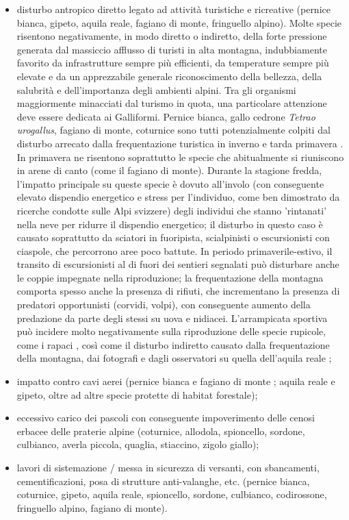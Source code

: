 \documentclass[10pt,twoside,openany,x11names,svgnames,italian,a5paper,dvipsnames,table]{memoir}
\begin{document}
\begin{itemize}
  \item disturbo antropico diretto legato ad attività turistiche e ricreative (pernice bianca, gipeto, aquila reale, fagiano di monte, fringuello alpino). Molte specie risentono negativamente, in modo diretto o indiretto, della forte pressione generata dal massiccio afflusso di turisti in alta montagna, indubbiamente favorito da infrastrutture sempre più efficienti, da temperature sempre più elevate e da un apprezzabile generale riconoscimento della bellezza, della salubrità e dell'importanza degli ambienti alpini. Tra gli organismi maggiormente minacciati dal turismo in quota, una particolare attenzione deve essere dedicata ai Galliformi. Pernice bianca, gallo cedrone \emph{Tetrao urogallus}, fagiano di monte, coturnice sono tutti potenzialmente colpiti dal disturbo arrecato dalla frequentazione turistica in inverno e tarda primavera \cite{Brenot96} \cite{Arlettaz07} \cite{Mollet07} \cite{Thiel07}. In primavera ne risentono soprattutto le specie che abitualmente si riuniscono in arene di canto (come il fagiano di monte). Durante la stagione fredda, l'impatto principale su queste specie è dovuto all'involo (con conseguente elevato dispendio energetico e stress per l'individuo, come ben dimostrato da ricerche condotte sulle Alpi svizzere) degli individui che stanno 'rintanati' nella neve per ridurre il dispendio energetico; il disturbo in questo caso è causato soprattutto da sciatori in fuoripista, scialpinisti o escursionisti con ciaspole, che percorrono aree poco battute. In periodo primaverile-estivo, il transito di escursionisti al di fuori dei sentieri segnalati può disturbare anche le coppie impegnate nella riproduzione; la frequentazione della montagna comporta spesso anche la presenza di rifiuti, che incrementano la presenza di predatori opportunisti (corvidi, volpi), con conseguente aumento della predazione da parte degli stessi su uova e nidiacei. L'arrampicata sportiva può incidere molto negativamente sulla riproduzione delle specie rupicole, come i rapaci \cite{Brambilla04} \cite{Brambilla10}, così come il disturbo indiretto causato dalla frequentazione della montagna, dai fotografi e dagli osservatori su quella dell'aquila reale \cite{Pedrini91};
  \item impatto contro cavi aerei (pernice bianca e fagiano di monte \cite{Buffet13}; aquila reale e gipeto, oltre ad altre specie protette di habitat forestale);
  \item eccessivo carico dei pascoli con conseguente impoverimento delle cenosi erbacee delle praterie alpine (coturnice, allodola, spioncello, sordone, culbianco, averla piccola, quaglia, stiaccino, zigolo giallo);
  \item lavori di sistemazione / messa in sicurezza di versanti, con sbancamenti, cementificazioni, posa di strutture anti-valanghe, etc. (pernice bianca, coturnice, gipeto, aquila reale, spioncello, sordone, culbianco, codirossone, fringuello alpino, fagiano di monte).
\end{itemize}
\end{document}
